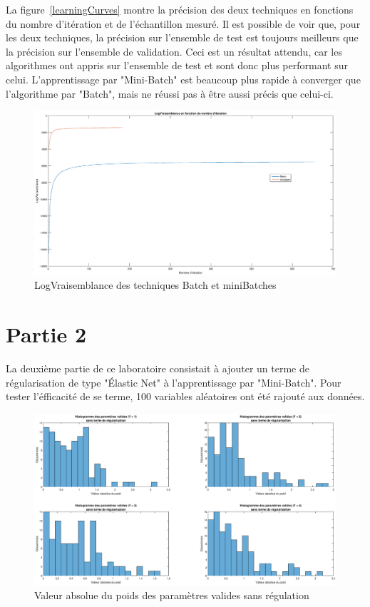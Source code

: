 \documentclass[a4paper, 12pt]{article} %
\begin{document}
La figure~\ref{learningCurves} montre la précision des deux techniques en fonctions du nombre d'itération et de l'échantillon mesuré. Il est possible de voir que, pour les deux techniques, la 
précision sur l'ensemble de test est toujours meilleurs que la précision sur l'ensemble de validation. Ceci est un résultat attendu, car les algorithmes ont appris sur l'ensemble de test et sont 
donc plus performant sur celui. L'apprentissage par "Mini-Batch" est beaucoup plus rapide à converger que l'algorithme par "Batch", mais ne réussi pas à être aussi précis que celui-ci.
\begin{figure}[H]
\label{logVraisemblance}
\caption{LogVraisemblance des techniques Batch et miniBatches}
\includegraphics[width=\textwidth,height=\textheight,keepaspectratio]{graphics/logValidityCurves.eps}
\end{figure}

\section*{Partie 2}
La deuxième partie de ce laboratoire consistait à ajouter un terme de régularisation de type "Élastic Net" à l'apprentissage par "Mini-Batch". Pour tester l'éfficacité de se terme, 100 variables aléatoires
ont été rajouté aux données.
\begin{figure}[H]
\label{weightNoRegulation}
\caption{Valeur absolue du poids des paramètres valides sans régulation}
\includegraphics[width=\textwidth,height=\textheight,keepaspectratio]{graphics/histoValidParameterNoRegulation.eps}
\end{figure}
\end{document}
